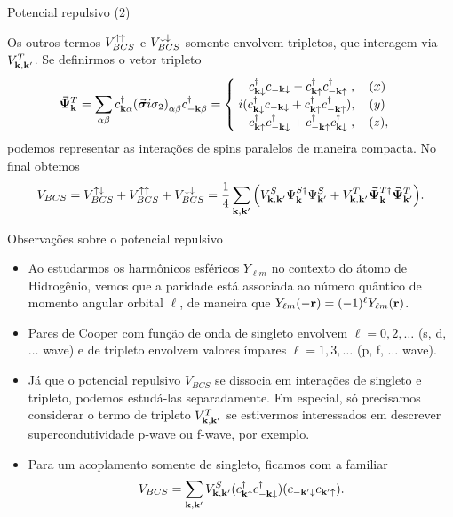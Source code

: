 \documentclass[aspectratio=169,xcolor={table,dvipsnames,usenames}]{beamer}
\begin{document}
\begin{frame}{Potencial repulsivo (2)}

Os outros termos $V_{BCS}^{\uparrow\uparrow}$ e $V_{BCS}^{\downarrow\downarrow}$ somente envolvem tripletos, que interagem via $V_{\vb{k},\vb{k}'}^T$. Se definirmos o vetor tripleto
$$
\va*{\Psi}_{\vb{k}}^T = \sum_{\alpha\beta} c_{\vb{k}\alpha}^\dagger \qty(\va*{\sigma} i \sigma_2)_{\alpha\beta} c_{-\vb{k}\beta}^\dagger =
\begin{cases}
\; \; \; \; c_{\vb{k}\downarrow}^\dagger c_{-\vb{k}\downarrow} - c_{\vb{k}\uparrow}^\dagger c_{-\vb{k}\uparrow}^\dagger \; , \quad (x) \\
\; i (c_{\vb{k}\downarrow}^\dagger c_{-\vb{k}\downarrow} + c_{\vb{k}\uparrow}^\dagger c_{-\vb{k}\uparrow}^\dagger), \quad (y) \\
\; \; \; \; c_{\vb{k}\uparrow}^\dagger c_{-\vb{k}\downarrow}^\dagger + c_{-\vb{k}\uparrow}^\dagger c_{\vb{k}\downarrow}^\dagger \; , \quad (z),
\end{cases}
$$
podemos representar as interações de spins paralelos de maneira compacta. No final obtemos
$$
V_{BCS} =
V_{BCS}^{\uparrow\downarrow} + V_{BCS}^{\uparrow\uparrow} + V_{BCS}^{\downarrow\downarrow} =
\frac{1}{4} \sum_{\vb{k},\vb{k}'}
\qty(
V_{\vb{k},\vb{k}'}^S \Psi_{\vb{k}}^{S\dagger} \Psi_{\vb{k}'}^S +
V_{\vb{k},\vb{k}'}^T \va*{\Psi}_{\vb{k}}^{T\dagger} \va*{\Psi}_{\vb{k}'}^T
).
$$

\end{frame}


\begin{frame}{Observações sobre o potencial repulsivo}

\begin{itemize}
\item Ao estudarmos os harmônicos esféricos $Y_{\ell m}$ no contexto do átomo de Hidrogênio, vemos que a paridade está associada ao número quântico de momento angular orbital $\ell$, de maneira que $Y_{\ell m}(-\vb{r}) = (-1)^\ell Y_{\ell m}(\vb{r})$.

\n

\item Pares de Cooper com função de onda de singleto envolvem $\ell = 0, 2, \ldots$ (s, d, $\ldots$ wave) e de tripleto envolvem valores ímpares $\ell = 1, 3, \ldots$ (p, f, $\ldots$ wave).

\n

\item Já que o potencial repulsivo $V_{BCS}$ se dissocia em interações de singleto e tripleto, podemos estudá-las separadamente. Em especial, só precisamos considerar o termo de tripleto $V^T_{\vb{k},\vb{k}'}$ se estivermos interessados em descrever supercondutividade p-wave ou f-wave, por exemplo.

\n

\item Para um acoplamento somente de singleto, ficamos com a familiar
$$
V_{BCS} = \sum_{\vb{k},\vb{k}'} V_{\vb{k},\vb{k}'}^S (c_{\vb{k}\uparrow}^\dagger c_{-\vb{k}\downarrow}^\dagger) (c_{-\vb{k}'\downarrow} c_{\vb{k}'\uparrow}).
$$
\end{itemize}

\end{frame}
\end{document}
